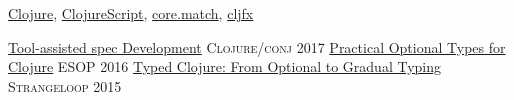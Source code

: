 \documentclass[10pt,a4paper]{article}
\begin{document}

%



%
\bodytext
  {\href{https://github.com/clojure/clojure/commits?author=frenchy64}{Clojure},
   \href{https://github.com/clojure/clojurescript/commits?author=frenchy64}{ClojureScript},
   \href{https://github.com/clojure/core.match/commits?author=frenchy64}{core.match},
   \href{https://github.com/cljfx/cljfx/commits?author=frenchy64}{cljfx}
   }



\headedsection
  {\href{https://www.youtube.com/watch?v=kcZVkvO1Dpo}{Tool-assisted spec Development}}
  {\textsc{Clojure/conj 2017}} {%
}
\headedsection
  {\href{http://ambrosebs.com/talks/esop16.pdf}{Practical Optional Types for Clojure}}
  {\textsc{ESOP 2016}} {%
  }
\headedsection
  {\href{https://www.youtube.com/watch?v=yG9CffLlXx0}{Typed Clojure: From Optional to Gradual Typing}}
  {\textsc{Strangeloop 2015}} {%
}
\end{document}
